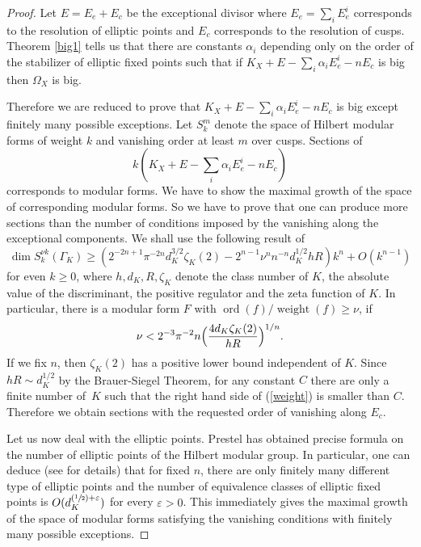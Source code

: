 \documentclass[10pt]{amsart}
\let\epsilon\varepsilon
\newcommand{\Psfrac}[2]{(\sfrac{#1}{#2})}
\theoremstyle{plain}
\theoremstyle{definition}
\numberwithin{equation}{theorem}
\DeclareMathOperator{\ord}{ord}
\DeclareMathOperator{\weight}{weight}
\begin{document}
\begin{proof}
Let $E=E_e+E_c$ be the exceptional divisor where $E_e=\sum_i E_e^i$ corresponds to the resolution of elliptic points and $E_c$ corresponds to the resolution of cusps. Theorem \ref{big1} tells us that there are constants $\alpha_i$ depending only on the order of the stabilizer of elliptic fixed points such that if $K_X+E-\sum_i \alpha_i E_e^i - nE_c$ is big then $\Omega_X$ is big.

Therefore we are reduced to prove that $K_X+E-\sum_i \alpha_i E_e^i - nE_c$ is big except finitely many possible exceptions. Let $S_k^m$ denote the space of Hilbert modular forms of weight $k$ and vanishing order at least $m$ over cusps. Sections of $$\textstyle k(K_X+E-\sum_i \alpha_i E_e^i - nE_c)$$ corresponds to modular forms. We have to show the maximal growth of the space of corresponding modular forms.
So we have to prove that one can produce more sections than the number of conditions imposed by the vanishing along the exceptional components.
We shall use the following result of \cite[\S4]{Tsu85}
\begin{equation}\label{RR}
\dim S_k^{\nu k}(\Gamma_K) \geq (2^{-2n+1}\pi^{-2n} d_K^{3/2} \zeta_K(2)-2^{n-1}\nu^nn^{-n}d_K^{1/2}hR)k^n+O(k^{n-1})
\end{equation}
for even $k \geq 0$, where $h, d_K, R, \zeta_K$ denote the class number of $K$, the absolute value of the discriminant, the positive regulator and the zeta function of $K$.
In particular, there is a modular form $F$ with $\ord (f)/\weight(f) \geq \nu$, if
\begin{equation}\label{weight}
\nu < 2^{-3}\pi^{-2}n\Bigl( \frac{4d_K\zeta_K(2)}{hR}\Bigr)^{1/n}.
\end{equation}
If we fix $n$, then $\zeta_K(2)$ has a positive lower bound independent of $K$. Since $hR \sim d_K^{1/2}$ by the Brauer-Siegel Theorem, for any constant $C$ there are only a finite number of~$K$ such that the right hand side of (\ref{weight}) is smaller than $C$.
Therefore we obtain sections with the requested order of vanishing along $E_c$.

Let us now deal with the elliptic points.
Prestel \cite{Prestel} has obtained precise formula on the number of elliptic points of the Hilbert modular group.
In particular, one can deduce (see \cite[\S6.5]{RT} for details) that for fixed $n$, there are only finitely many different type of elliptic points and the number of equivalence classes of elliptic fixed points is $O(d_K^{\Psfrac{1}{2}+\epsilon})$ for every $\epsilon>0$.
This immediately gives the maximal growth of the space of modular forms satisfying the vanishing conditions with finitely many possible exceptions.
\end{proof}
\end{document}
